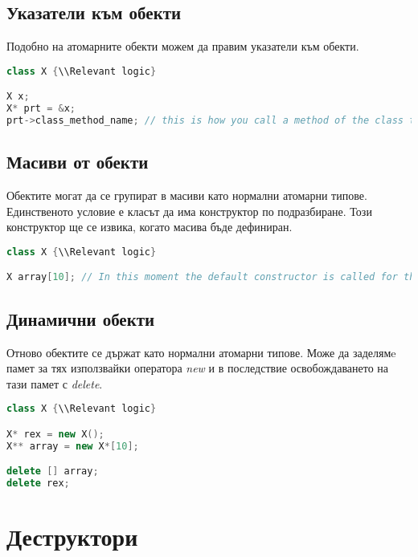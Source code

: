 \documentclass[fleqn,12pt]{article}
\begin{document}
\subsection{Указатели към обекти}
Подобно на атомарните обекти можем да правим указатели към обекти. 
\begin{lstlisting}[language=C++, caption=Example creation of pointers]
class X {\\Relevant logic}

X x;
X* prt = &x;
prt->class_method_name; // this is how you call a method of the class through the pointer.
\end{lstlisting}


\subsection{Масиви от обекти}
Обектите могат да се групират в масиви като нормални атомарни типове. Единственото условие е класът да има конструктор по подразбиране. Този конструктор ще се извика, когато масива бъде дефиниран.

\begin{lstlisting}[language=C++, caption=Example creation of an array of objects]
class X {\\Relevant logic}

X array[10]; // In this moment the default constructor is called for the 10 elements created.
\end{lstlisting}


\subsection{Динамични обекти}
Отново обектите се държат като нормални атомарни типове. Може да заделямe памет за тях използвайки оператора \textit{new} и в последствие освобождаването на тази памет с \textit{delete}.

\begin{lstlisting}[language=C++, caption=Example creation of dynamic objects]
class X {\\Relevant logic}

X* rex = new X();
X** array = new X*[10];

delete [] array;
delete rex;
\end{lstlisting}


\section{Деструктори}
\end{document}
